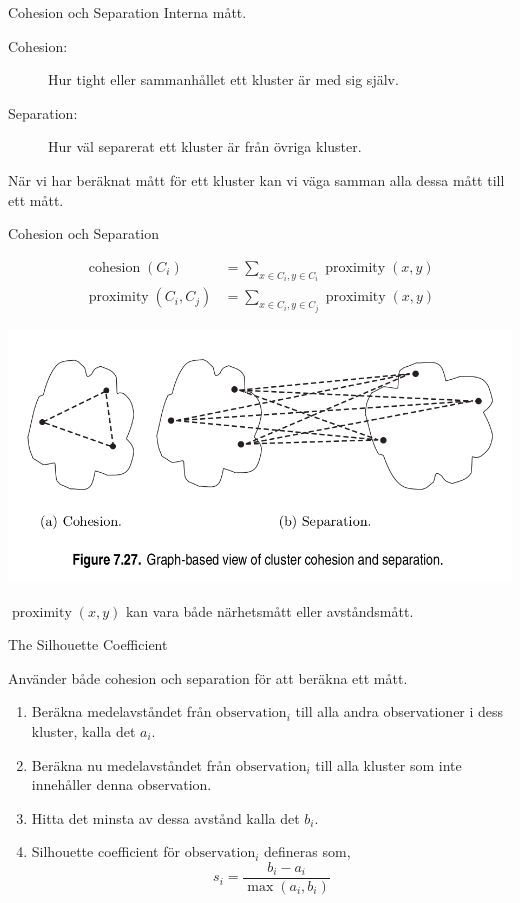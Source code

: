 \documentclass[10pt,english]{beamer}
\begin{document}
\begin{frame}{Cohesion och Separation}
    Interna mått.
    \begin{description}
        \item[Cohesion:] Hur tight eller sammanhållet ett kluster är med sig själv.
        \item[Separation:] Hur väl separerat ett kluster är från övriga kluster.
    \end{description}
    
    När vi har beräknat mått för ett kluster kan vi väga samman alla dessa mått till ett mått.

\end{frame}

\begin{frame}{Cohesion och Separation}
    
    \begin{align*}
        \operatorname{cohesion}(C_i) &= \sum_{x \in C_i, y \in C_i} \operatorname{proximity}(x,y) \\
        \operatorname{proximity}(C_i, C_j) &= \sum_{x \in C_i, y \in C_j} \operatorname{proximity}(x,y)
    \end{align*}

    \includegraphics[width=.8\textwidth]{figs/cohesion and separation.1.png}

    $\operatorname{proximity}(x,y)$ kan vara både närhetsmått eller avståndsmått.

\end{frame}

\begin{frame}{The Silhouette Coefficient}
    
    Använder både cohesion och separation för att beräkna ett mått.

    \begin{enumerate}
        \item Beräkna medelavståndet från $\text{observation}_i$ till alla andra observationer i dess kluster, kalla det $a_i$.
        \item Beräkna nu medelavståndet från $\text{observation}_i$ till alla kluster som inte innehåller denna observation.
        \item Hitta det minsta av dessa avstånd kalla det $b_i$.
        \item Silhouette coefficient för $\text{observation}_i$ defineras som,
        \begin{equation*}
            s_i = \frac{b_i - a_i}{\max(a_i, b_i)}
        \end{equation*}
    \end{enumerate}

\end{frame}
\end{document}
